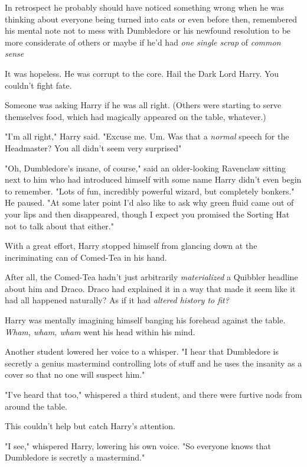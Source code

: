 In retrospect he probably should have noticed something wrong when he was
thinking about everyone being turned into cats{\el} or even before then,
remembered his mental note not to mess with Dumbledore{\el} or his newfound
resolution to be more considerate of others{\el} or maybe if he'd had
\emph{one single scrap} of \emph{common sense}{\el}

It was hopeless. He was corrupt to the core. Hail the Dark Lord Harry. You
couldn't fight fate.

Someone was asking Harry if he was all right. (Others were starting to serve
themselves food, which had magically appeared on the table, whatever.)

"I'm all right," Harry said. "Excuse me. Um. Was that a{\el} \emph{normal}
speech for the Headmaster? You all{\el} didn't seem{\el} very
surprised{\el}"

"Oh, Dumbledore's insane, of course," said an older-looking Ravenclaw sitting
next to him who had introduced himself with some name Harry didn't even begin
to remember. "Lots of fun, incredibly powerful wizard, but completely bonkers."
He paused. "At some later point I'd also like to ask why green fluid came out
of your lips and then disappeared, though I expect you promised the Sorting Hat
not to talk about that either."

With a great effort, Harry stopped himself from glancing down at the
incriminating can of Comed-Tea in his hand.

After all, the Comed-Tea hadn't just arbitrarily \emph{materialized} a Quibbler
headline about him and Draco. Draco had explained it in a way that made it seem
like it had all happened{\el} naturally? As if it had \emph{altered history
to fit?}

Harry was mentally imagining himself banging his forehead against the table.
\emph{Wham, wham, wham} went his head within his mind.

Another student lowered her voice to a whisper. "I hear that Dumbledore is
secretly a genius mastermind controlling lots of stuff and he uses the insanity
as a cover so that no one will suspect him."

"I've heard that too," whispered a third student, and there were furtive nods
from around the table.

This couldn't help but catch Harry's attention.

"I see," whispered Harry, lowering his own voice. "So everyone knows that
Dumbledore is secretly a mastermind."

